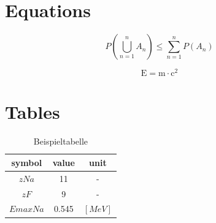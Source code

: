 












\section{Equations}\label{sec:equations}

\begin{mycapequ}[!htbp]
    \begin{equation}
        {P(\bigcup_{n=1}^n A_n) \leq \sum_{n=1}^n P(A_n)}
        \label{eq:bool1} %
    \end{equation}
    \caption{Bool'sche Gleichung}
\end{mycapequ}

\begin{mycapequ}[!htbp]
    \begin{equation}
        \mathrm{E=m\cdot c^2}
        \label{eq:meequi} %
    \end{equation}
    \caption{Albert Einstein's mass-energy equivalence}
\end{mycapequ}

\clearpage

\section{Tables}\label{sec:tables}

\begin{table}[!htbp]
\centering
    \begin{tabular}{ | c | c | c | }
        \hline
        symbol & value & unit \\ \hline
        $z Na$ & 11 & - \\ \hline
        $z F$ & 9 & - \\ \hline
        $Emax Na$ & 0.545 & $[MeV]$ \\ \hline
    \end{tabular}
    \caption{Beispieltabelle}
    \label{tab:example} %
\end{table}

